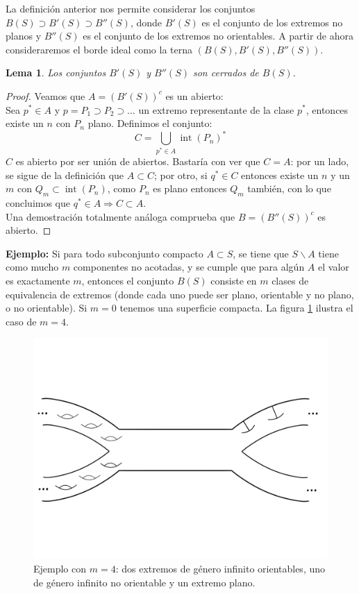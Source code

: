 \documentclass[a4paper,11pt,spanish, twoside, leqno]{tfg-uam}
\newtheorem{lema}[teor]{Lema}
\DeclareMathOperator{\interior}{int}
\theoremstyle{definition}
\begin{document}
La definición anterior nos permite considerar los conjuntos $B(S) \supset B'(S) \supset B''(S)$, donde $B'(S)$  es el conjunto de los extremos no planos y $B''(S)$ es el conjunto de los extremos no orientables. A partir de ahora consideraremos el borde ideal como la terna $(B(S), B'(S), B''(S))$.
\begin{lema}
Los conjuntos $B'(S)$ y $B''(S)$ son cerrados de $B(S)$. 
\end{lema}
\begin{proof}
Veamos que $A = (B'(S))^c$ es un abierto:\\
Sea $p^* \in A$ y $p = P_1 \supset P_2 \supset \ldots$ un extremo representante de la clase $p^*$, entonces existe un $n$ con $P_n$ plano. Definimos el conjunto:
\[
C = \bigcup_{p^* \in A} \interior(P_n)^*
\]
$C$ es abierto por ser unión de abiertos. Bastaría con ver que $C=A$: por un lado, se sigue de la definición que $A\subset C$; por otro, si $q^* \in C$ entonces existe un $n$ y un $m$ con $Q_m \subset \interior(P_n)$, como $P_n$ es plano entonces $Q_m$ también, con lo que concluimos que $q^* \in A \Rightarrow C\subset A$.\\
Una demostración totalmente análoga comprueba que $B = (B''(S))^c$ es abierto.
\end{proof}
\noindent \textbf{Ejemplo:} Si para todo subconjunto compacto $A\subset S$, se tiene que $S\backslash A$ tiene como mucho $m$ componentes no acotadas, y se cumple que para algún $A$ el valor es exactamente $m$, entonces el conjunto $B(S)$ consiste en $m$ clases de equivalencia de extremos (donde cada uno puede ser plano, orientable y no plano, o no orientable). Si $m=0$ tenemos una superficie compacta. La figura \ref{fig:m4} ilustra el caso de $m=4$.


\begin{figure}[h!]
	\centering
	\includegraphics[width=0.5\linewidth]{imagenes/m4.png}
	\caption{Ejemplo con $m=4$: dos extremos de género infinito orientables, uno de género infinito no orientable y un extremo plano.}
	\label{fig:m4}
\end{figure}
\end{document}

